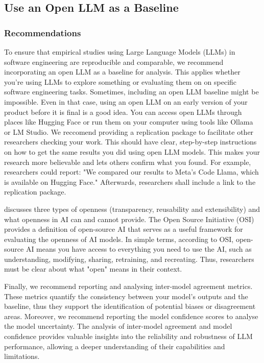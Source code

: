 \documentclass[11pt]{article}
\begin{document}
\subsection{Use an Open LLM as a Baseline}

\subsubsection{Recommendations}

To ensure that empirical studies using Large Language Models (LLMs) in software engineering are reproducible and comparable, we recommend incorporating an open LLM as a baseline for analysis. This applies whether you're using LLMs to explore something or evaluating them on on specific software engineering tasks. 
Sometimes, including an open LLM baseline might be impossible. Even in that case, using an open LLM on an early version of your product before it is final is a good idea.
You can access open LLMs through places like Hugging Face or run them on your computer using tools like Ollama or LM Studio. 
We reccomend providing a replication package to facilitate other researchers checking your work. This should have clear, step-by-step instructions on how to get the same results you did using open LLM models. This makes your research more believable and lets others confirm what you found. For example, researchers could report: "We compared our results to Meta's Code Llama, which is available on Hugging Face." Afterwards, researchers shall include a link to the replication package.

\citet{widder2024open} discusses three types of openness (transparency, reusability and extensibility) and  what openness in AI can and cannot provide. The Open Source Initiative (OSI) \cite{OSIAI2024} provides a definition of open-source AI that serves as a useful framework for evaluating the openness of AI models. In simple terms, according to OSI, open-source AI means you have access to everything you need to use the AI, such as understanding, modifying, sharing, retraining, and recreating. Thus, researchers must be clear about what "open" means in their context.

Finally, we recommend reporting and analysing inter-model agreement metrics. These metrics quantify the consistency between your model's outputs and the baseline, thus they support the identification of potential biases or disagreement areas.  Moreover, we recommend reporting the model confidence scores to analyse the model uncertainty.  The analysis of inter-model agreement and model confidence provides valuable insights into the reliability and robustness of LLM performance, allowing a deeper understanding of their capabilities and limitations.
\end{document}
